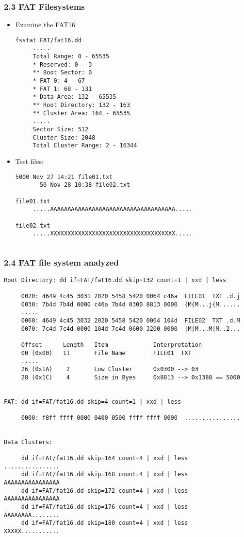 \begin{frame}[fragile]
  \frametitle{2.3 FAT Filesystems}
    \begin{itemize}
	    \item Examine the FAT16
  \begin{lstlisting}[basicstyle=\tiny]
fsstat FAT/fat16.dd
     .....
     Total Range: 0 - 65535
     * Reserved: 0 - 3
     ** Boot Sector: 0
     * FAT 0: 4 - 67
     * FAT 1: 68 - 131
     * Data Area: 132 - 65535
     ** Root Directory: 132 - 163
     ** Cluster Area: 164 - 65535
     .....
     Sector Size: 512
     Cluster Size: 2048
     Total Cluster Range: 2 - 16344
  \end{lstlisting}
	    \item Test files:
  \begin{lstlisting}[basicstyle=\tiny]
     5000 Nov 27 14:21 file01.txt
       50 Nov 28 10:38 file02.txt

file01.txt
     .....AAAAAAAAAAAAAAAAAAAAAAAAAAAAAAAAAAAA.....
  
file02.txt
     .....XXXXXXXXXXXXXXXXXXXXXXXXXXXXXXXXXXXX.....
  
\end{lstlisting}
    \end{itemize}
\end{frame}


\begin{frame}[fragile]
  \frametitle{2.4 FAT file system analyzed}
  \begin{lstlisting}[basicstyle=\tiny]
Root Directory: dd if=FAT/fat16.dd skip=132 count=1 | xxd | less

     0020: 4649 4c45 3031 2020 5458 5420 0064 c46a  FILE01  TXT .d.j
     0030: 7b4d 7b4d 0000 c46a 7b4d 0300 8813 0000  {M{M...j{M......
     .....
     0060: 4649 4c45 3032 2020 5458 5420 0064 104d  FILE02  TXT .d.M
     0070: 7c4d 7c4d 0000 104d 7c4d 0600 3200 0000  |M|M...M|M..2...
 
     Offset      Length   Item             Interpretation
     00 (0x00)   11       File Name        FILE01  TXT
     .....
     26 (0x1A)    2       Low Cluster      0x0300 --> 03
     28 (0x1C)    4       Size in Byes     0x8813 --> 0x1388 == 5000


FAT: dd if=FAT/fat16.dd skip=4 count=1 | xxd | less

     0000: f8ff ffff 0000 0400 0500 ffff ffff 0000  ................


Data Clusters:

     dd if=FAT/fat16.dd skip=164 count=4 | xxd | less    ................
     dd if=FAT/fat16.dd skip=168 count=4 | xxd | less    AAAAAAAAAAAAAAAA
     dd if=FAT/fat16.dd skip=172 count=4 | xxd | less    AAAAAAAAAAAAAAAA
     dd if=FAT/fat16.dd skip=176 count=4 | xxd | less    AAAAAAAA........
     dd if=FAT/fat16.dd skip=180 count=4 | xxd | less    XXXXX...........
\end{lstlisting}
\end{frame}


